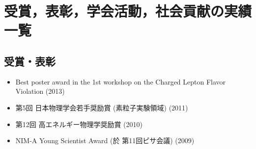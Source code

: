 \documentclass[11pt,a4paper,uplatex,dvipdfmx]{ujarticle} 		%
\newcommand{\研究課題名}{象の卵}
\newcommand{\研究機関名}{東京大学}
\newcommand{\研究代表者氏名}{内山雄祐}
\newcommand{\研究期間の最終元号年度}{6}  %
\newcommand*{\meg}{\muup\to \mathrm{e} \gammaup}
\newcommand*{\megc}{\ifmmode\muup^+ \to \mathrm{e}^+ \gammaup\else$\muup^+ \to \mathrm{e}^+ \gammaup$\fi}
\begin{document}
%	
%	
%	
%	


\newpage




\section{受賞，表彰，学会活動，社会貢献の実績一覧}
\subsection{受賞・表彰}
\begin{itemize}
\item Best poster award in the 1st workshop on the Charged Lepton Flavor Violation (2013) \cite{rmd1}
\item 第5回 日本物理学会若手奨励賞 (素粒子実験領域) (2011)
\item 第12回 高エネルギー物理学奨励賞 (2010)
\item NIM-A Young Scientist Award (於 第11回ピサ会議) (2009) \cite{gamma_rec}
\end{itemize}
\end{document}
